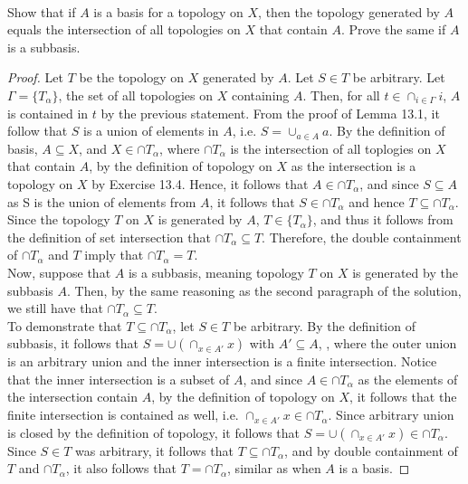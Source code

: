 \documentclass[12pt]{article}
\newenvironment{problem}[2][Problem]
{
	\begin{trivlist} 
		\item[\hskip \labelsep {\bfseries #1 #2:}]
	}
{
	\end{trivlist}
	}
\begin{document}
%
%

\begin{problem}{13.5} \ \\
Show that if \(A\) is a basis for a topology on \(X\), then the topology generated by \(A\) equals the intersection of all topologies on \(X\) that contain \(A\). Prove the same if \(A\) is a subbasis.
\end{problem}

\begin{proof}
Let \(T\) be the topology on \(X\) generated by \(A\). Let \(S \in T\) be arbitrary. Let \(\Gamma = \{T_\alpha\}\), the set of all topologies on \(X\) containing \(A\). Then, for all \(t \in \cap_{i \in \Gamma} i\), \(A\) is contained in \(t\) by the previous statement.  From the proof of Lemma 13.1, it follow that \(S\) is a union of elements in \(A\), i.e. \(S = \cup_{a \in A} a\). By the definition of basis, \(A \subseteq X\), and \(X \in \cap T_\alpha\), where \(\cap T_\alpha\) is the intersection of all toplogies on \(X\) that contain \(A\), by the definition of topology on \(X\) as the intersection is a topology on \(X\) by Exercise 13.4. Hence, it follows that \(A \in \cap T_\alpha\), and since \(S \subseteq A\) as S is the union of elements from \(A\), it follows that \(S \in \cap T_\alpha\) and hence \(T \subseteq \cap T_\alpha\). \newline \\
Since the topology \(T\) on \(X\) is generated by \(A\), \(T \in \{T_\alpha\}\), and thus it follows from the definition of set intersection that \(\cap T_\alpha \subseteq T\). Therefore, the double containment of \(\cap T_\alpha\) and \(T\) imply that \(\cap T_\alpha = T\). \newline \\
Now, suppose that \(A\) is a subbasis, meaning topology \(T\) on \(X\) is generated by the subbasis \(A\). Then, by the same reasoning as the second paragraph of the solution, we still have that \(\cap T_\alpha \subseteq T\). \newline \\
To demonstrate that \(T \subseteq \cap T_\alpha\), let \(S \in T\) be arbitrary. By the definition of subbasis, it follows that \(S = \cup(\cap_{x \in A'} x)\) with \(A' \subseteq A\), , where the outer union is an arbitrary union and the inner intersection is a finite intersection. Notice that the inner intersection is a subset of \(A\), and since \(A \in \cap T_\alpha\) as the elements of the intersection contain \(A\), by the definition of topology on \(X\), it follows that the finite intersection is contained as well, i.e. \(\cap_{x \in A'} x \in \cap T_\alpha\). Since arbitrary union is closed by the definition of topology, it follows that \(S = \cup(\cap_{x \in A'} x) \in \cap T_\alpha\). Since \(S \in T\) was arbitrary, it follows that \(T \subseteq \cap T_\alpha\), and by double containment of \(T\) and \(\cap T_\alpha\), it also follows that \(T = \cap T_\alpha\), similar as when \(A\) is a basis. 
\end{proof}
\end{document}
